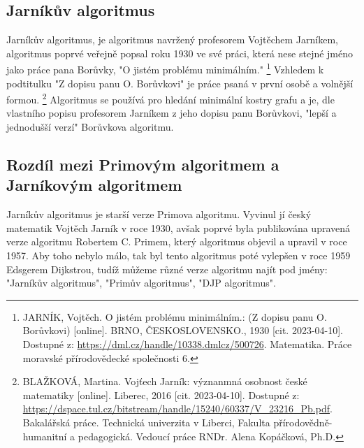 \documentclass[11pt]{article}
\begin{document}
\subsection{Jarníkův algoritmus}
Jarníkův algoritmus, je algoritmus navržený profesorem Vojtěchem Jarníkem, algoritmus poprvé veřejně popsal roku 1930 ve své práci, která nese stejné jméno jako práce pana Borůvky, "O jistém problému minimálním."
\footnote{JARNÍK, Vojtěch. O jistém problému minimálním.: (Z dopisu panu O. Borůvkovi) [online]. BRNO, ČESKOSLOVENSKO., 1930 [cit. 2023-04-10]. Dostupné z: \url{https://dml.cz/handle/10338.dmlcz/500726}. Matematika. Práce moravské přírodovědecké společnosti 6.} Vzhledem k podtitulku "Z dopisu panu O. Borůvkovi" je práce psaná v první osobě a volnější formou.
\footnote{BLAŽKOVÁ, Martina. Vojťech Jarník: význanmná osobnost české matematiky [online]. Liberec, 2016 [cit. 2023-04-10]. Dostupné z: \url{https://dspace.tul.cz/bitstream/handle/15240/60337/V_23216_Pb.pdf}. Bakalářská práce. Technická univerzita v Liberci, Fakulta přírodovědně-humanitní a pedagogická. Vedoucí práce RNDr. Alena Kopáčková, Ph.D.} Algoritmus se používá pro hledání minimální kostry grafu a je, dle vlastního popisu profesorem Jarníkem z jeho dopisu panu Borůvkovi, "lepší a jednodušší verzí" Borůvkova algoritmu.

\subsection{Rozdíl mezi Primovým algoritmem a Jarníkovým algoritmem}
Jarníkův algoritmus je starší verze Primova algoritmu. Vyvinul jí český matematik Vojtěch Jarník v roce 1930, avšak poprvé byla publikována upravená verze algoritmu Robertem C. Primem, který algoritmus objevil a upravil v roce 1957. Aby toho nebylo málo, tak byl tento algoritmus poté vylepšen v roce 1959 Edsgerem Dijkstrou, tudíž můžeme různé verze algoritmu najít pod jmény: "Jarníkův algoritmus", "Primův algoritmus", "DJP algoritmus".

\pagebreak
\end{document}
